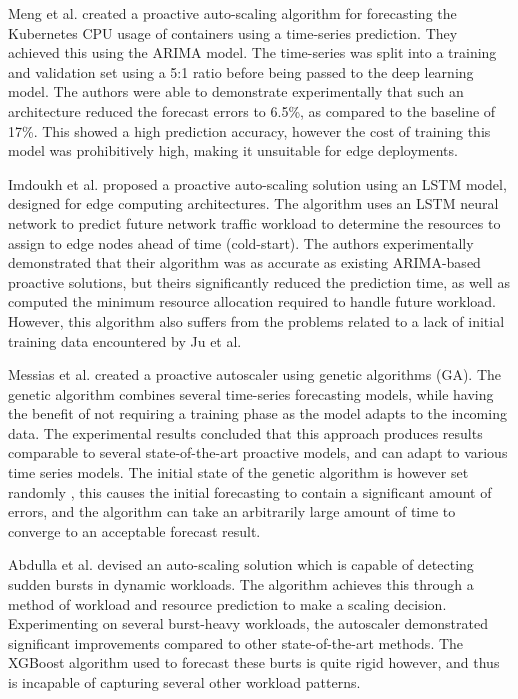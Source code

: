 Meng et al. \cite{meng2016crupa} created a proactive auto-scaling algorithm for forecasting the Kubernetes CPU usage of containers using a time-series prediction. They achieved this using the ARIMA model. The time-series was split into a training and validation set using a 5:1 ratio before being passed to the deep learning model. The authors were able to demonstrate experimentally that such an architecture reduced the forecast errors to 6.5\%, as compared to the baseline of 17\%. This showed a high prediction accuracy, however the cost of training this model was prohibitively high, making it unsuitable for edge deployments.\par

Imdoukh et al. \cite{imdoukh2020machine} proposed a proactive auto-scaling solution using an LSTM model, designed for edge computing architectures. The algorithm uses an LSTM neural network to predict future network traffic workload to determine the resources to assign to edge nodes ahead of time (cold-start). The authors experimentally demonstrated that their algorithm was as accurate as existing ARIMA-based proactive solutions, but theirs significantly reduced the prediction time, as well as computed the minimum resource allocation required to handle future workload. However, this algorithm also suffers from the problems related to a lack of initial training data encountered by Ju et al. \cite{ju2021proactive}\par

Messias et al. \cite{messias2016combining} created a proactive autoscaler using genetic algorithms (GA). The genetic algorithm combines several time-series forecasting models, while having the benefit of not requiring a training phase as the model adapts to the incoming data. The experimental results concluded that this approach produces results comparable to several state-of-the-art proactive models, and can adapt to various time series models. The initial state of the genetic algorithm is however set randomly \cite{lambora2019genetic}, this causes the initial forecasting to contain a significant amount of errors, and the algorithm can take an arbitrarily large amount of time to converge to an acceptable forecast result.\par

Abdulla et al. \cite{abdullah2020burst} devised an auto-scaling solution which is capable of detecting sudden bursts in dynamic workloads. The algorithm achieves this through a method of workload and resource prediction to make a scaling decision. Experimenting on several burst-heavy workloads, the autoscaler demonstrated significant improvements compared to other state-of-the-art methods. The XGBoost algorithm used to forecast these burts is quite rigid however, and thus is incapable of capturing several other workload patterns.\par

